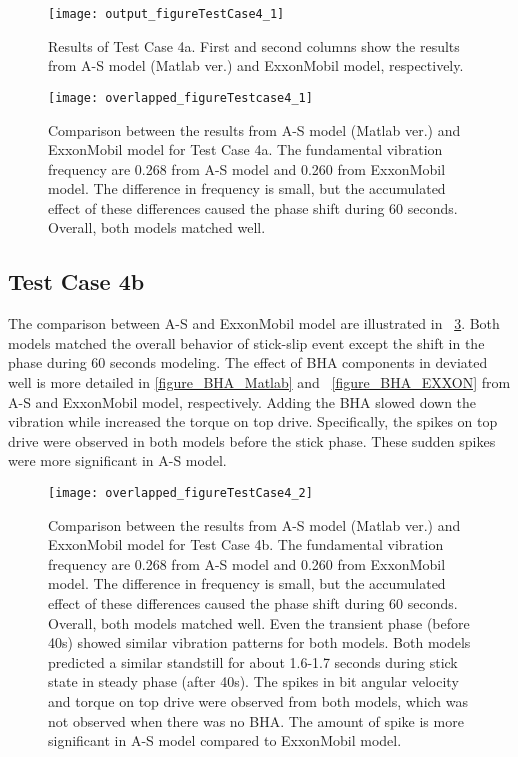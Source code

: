 \begin{figure}
  \centering
  \texttt{[image: output\_figureTestCase4\_1]}
  \caption[Results of Test Case 4a]{Results of Test Case 4a. First and second columns show the results from A-S model (Matlab ver.) and ExxonMobil model, respectively.}\label{figure_testcase4_1}
\end{figure}

\begin{figure}
  \centering
  \texttt{[image: overlapped\_figureTestcase4\_1]}
  \caption[Comparison of the results for Test Case 4a]{Comparison between the results from A-S model (Matlab ver.) and ExxonMobil model for Test Case 4a. The fundamental vibration frequency are 0.268 from A-S model and 0.260 from ExxonMobil model. The difference in frequency is small, but the accumulated effect of these differences caused the phase shift during 60 seconds. Overall, both models matched well.}\label{figure_testCase4_1_overlapped}
\end{figure}


\subsection{Test Case 4b}
The comparison between A-S and ExxonMobil model are illustrated in \figurename~\ref{figure_testcase4_2_overlapped}. Both models matched the overall behavior of stick-slip event except the shift in the phase during 60 seconds modeling. The effect of BHA components in deviated well is more detailed in \ref{figure_BHA_Matlab} and \figurename~\ref{figure_BHA_EXXON} from A-S and ExxonMobil model, respectively. Adding the BHA slowed down the vibration while increased the torque on top drive. Specifically, the spikes on top drive were observed in both models before the stick phase. These sudden spikes were more significant in A-S model. 


\begin{figure}
  \centering
  \texttt{[image: overlapped\_figureTestCase4\_2]}
  \caption[Comparison of the results for Test Case 4b]{Comparison between the results from A-S model (Matlab ver.) and ExxonMobil model for Test Case 4b. The fundamental vibration frequency are 0.268 from A-S model and 0.260 from ExxonMobil model. The difference in frequency is small, but the accumulated effect of these differences caused the phase shift during 60 seconds. Overall, both models matched well. Even the transient phase (before 40s) showed similar vibration patterns for both models. Both models predicted a similar standstill for about 1.6-1.7 seconds during stick state in steady phase (after 40s). The spikes in bit angular velocity and torque on top drive were observed from both models, which was not observed when there was no BHA. The amount of spike is more significant in A-S model compared to ExxonMobil model.}\label{figure_testcase4_2_overlapped}
\end{figure}

